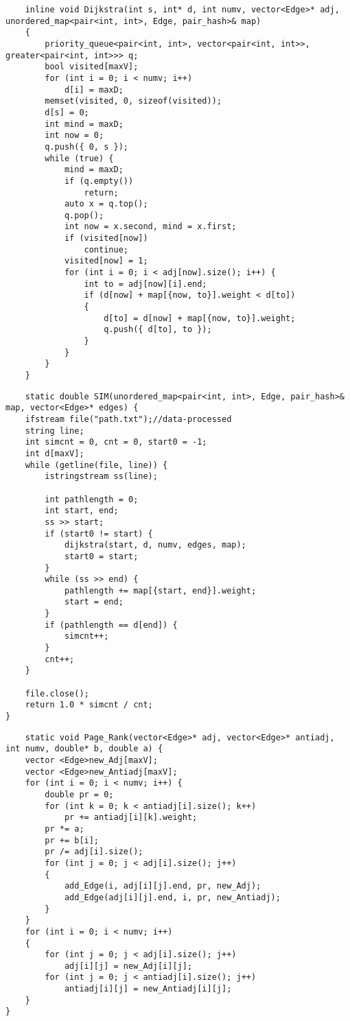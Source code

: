 \begin{verbatim}
    inline void Dijkstra(int s, int* d, int numv, vector<Edge>* adj, unordered_map<pair<int, int>, Edge, pair_hash>& map)
    {
        priority_queue<pair<int, int>, vector<pair<int, int>>, greater<pair<int, int>>> q;
        bool visited[maxV];
        for (int i = 0; i < numv; i++)
            d[i] = maxD;
        memset(visited, 0, sizeof(visited));
        d[s] = 0;
        int mind = maxD;
        int now = 0;
        q.push({ 0, s });
        while (true) {
            mind = maxD;
            if (q.empty())
                return;
            auto x = q.top();
            q.pop();
            int now = x.second, mind = x.first;
            if (visited[now])
                continue;
            visited[now] = 1;
            for (int i = 0; i < adj[now].size(); i++) {
                int to = adj[now][i].end;
                if (d[now] + map[{now, to}].weight < d[to])
                {
                    d[to] = d[now] + map[{now, to}].weight;
                    q.push({ d[to], to });
                }
            }
        }
    }
\end{verbatim}
\begin{verbatim}
    static double SIM(unordered_map<pair<int, int>, Edge, pair_hash>& map, vector<Edge>* edges) {
	ifstream file("path.txt");//data-processed
	string line;
	int simcnt = 0, cnt = 0, start0 = -1;
	int d[maxV];
	while (getline(file, line)) {
		istringstream ss(line);

		int pathlength = 0;
		int start, end;
		ss >> start;
		if (start0 != start) {
			dijkstra(start, d, numv, edges, map);
			start0 = start;
		}
		while (ss >> end) {
			pathlength += map[{start, end}].weight;
			start = end;
		}
		if (pathlength == d[end]) {
			simcnt++;
		}
		cnt++;
	}

	file.close();
	return 1.0 * simcnt / cnt;
}

\end{verbatim}

\begin{verbatim}
    static void Page_Rank(vector<Edge>* adj, vector<Edge>* antiadj, int numv, double* b, double a) {
	vector <Edge>new_Adj[maxV];
	vector <Edge>new_Antiadj[maxV];
	for (int i = 0; i < numv; i++) {
		double pr = 0;
		for (int k = 0; k < antiadj[i].size(); k++)
			pr += antiadj[i][k].weight;
		pr *= a;
		pr += b[i];
		pr /= adj[i].size();
		for (int j = 0; j < adj[i].size(); j++)
		{
			add_Edge(i, adj[i][j].end, pr, new_Adj);
			add_Edge(adj[i][j].end, i, pr, new_Antiadj);
		}
	}
	for (int i = 0; i < numv; i++)
	{
		for (int j = 0; j < adj[i].size(); j++)
			adj[i][j] = new_Adj[i][j];
		for (int j = 0; j < antiadj[i].size(); j++)
			antiadj[i][j] = new_Antiadj[i][j];
	}
}
\end{verbatim}

